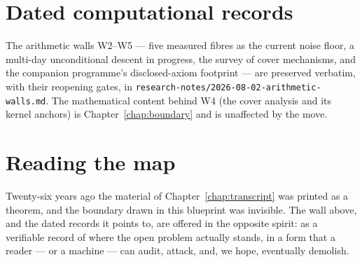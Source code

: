 \section{Dated computational records}

The arithmetic walls W2--W5 --- five measured fibres as the current noise floor, a
multi-day unconditional descent in progress, the survey of cover mechanisms, and the
companion programme's disclosed-axiom footprint --- are preserved verbatim, with their
reopening gates, in \texttt{research-notes/2026-08-02-arithmetic-walls.md}.  The
mathematical content behind W4 (the cover analysis and its kernel anchors) is
Chapter~\ref{chap:boundary} and is unaffected by the move.

\section*{Reading the map}

Twenty-six years ago the material of Chapter~\ref{chap:transcript} was printed as a
theorem, and the boundary drawn in this blueprint was invisible.  The wall above,
and the dated records it points to, are offered in the opposite spirit: as a verifiable record of where the open
problem actually stands, in a form that a reader --- or a machine --- can audit,
attack, and, we hope, eventually demolish.
